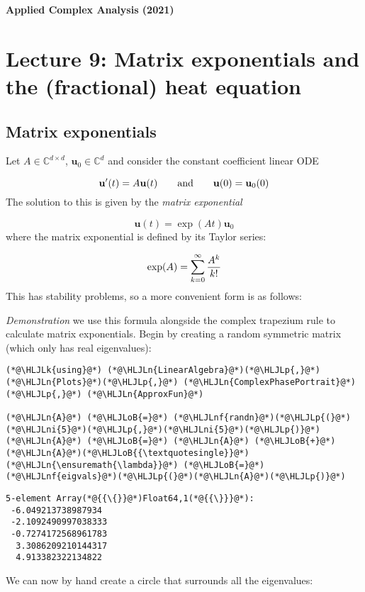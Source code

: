 \documentclass[12pt,a4paper]{article}
\newcommand{\HLJLk}[1]{\textcolor[RGB]{148,91,176}{\textbf{#1}}}
\newcommand{\HLJLn}[1]{#1}
\newcommand{\HLJLnf}[1]{\textcolor[RGB]{66,102,213}{#1}}
\newcommand{\HLJLni}[1]{\textcolor[RGB]{59,151,46}{#1}}
\newcommand{\HLJLoB}[1]{\textcolor[RGB]{102,102,102}{\textbf{#1}}}
\newcommand{\HLJLp}[1]{#1}
\begin{document}
\textbf{Applied Complex Analysis (2021)}

\section{Lecture 9: Matrix exponentials and the (fractional) heat equation}
\subsection{Matrix exponentials}
Let $A \in {\mathbb C}^{d \times d}$,   ${\mathbf u}_0 \in {\mathbb C}^d$ and consider the constant coefficient linear ODE

\[
    {\mathbf u}'(t) = A {\mathbf u}(t)\qquad\hbox{and}\qquad {\mathbf u}(0) = {\mathbf u}_0(0)
\]
The solution to this is given by the \emph{matrix exponential}

\[
    {\mathbf u}(t) = \exp(A t) {\mathbf u}_0
\]
where the matrix exponential is defined by its Taylor series:

\[
    \exp(A) = \sum_{k=0}^\infty {A^k \over k!}
\]
This has stability problems, so a more convenient form is as follows:

\emph{Demonstration} we use this formula alongside the complex trapezium rule to calculate matrix exponentials. Begin by creating a random symmetric matrix (which only has real eigenvalues):


\begin{lstlisting}
(*@\HLJLk{using}@*) (*@\HLJLn{LinearAlgebra}@*)(*@\HLJLp{,}@*) (*@\HLJLn{Plots}@*)(*@\HLJLp{,}@*) (*@\HLJLn{ComplexPhasePortrait}@*)(*@\HLJLp{,}@*) (*@\HLJLn{ApproxFun}@*)

(*@\HLJLn{A}@*) (*@\HLJLoB{=}@*) (*@\HLJLnf{randn}@*)(*@\HLJLp{(}@*)(*@\HLJLni{5}@*)(*@\HLJLp{,}@*)(*@\HLJLni{5}@*)(*@\HLJLp{)}@*)
(*@\HLJLn{A}@*) (*@\HLJLoB{=}@*) (*@\HLJLn{A}@*) (*@\HLJLoB{+}@*) (*@\HLJLn{A}@*)(*@\HLJLoB{{\textquotesingle}}@*)
(*@\HLJLn{\ensuremath{\lambda}}@*) (*@\HLJLoB{=}@*) (*@\HLJLnf{eigvals}@*)(*@\HLJLp{(}@*)(*@\HLJLn{A}@*)(*@\HLJLp{)}@*)
\end{lstlisting}

\begin{lstlisting}
5-element Array(*@{{\{}}@*)Float64,1(*@{{\}}}@*):
 -6.049213738987934
 -2.1092490997038333
 -0.7274172568961783
  3.3086209210144317
  4.913382322134822
\end{lstlisting}


We can now by hand create a circle that surrounds all the eigenvalues:
\end{document}
